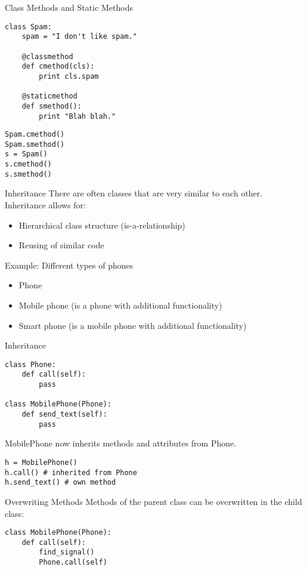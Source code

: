 \begin{frame}[fragile]{Class Methods and Static Methods}
\begin{lstlisting}[style=Python]
class Spam:
    spam = "I don't like spam."

    @classmethod
    def cmethod(cls):
        print cls.spam
       
    @staticmethod
    def smethod():
        print "Blah blah."
\end{lstlisting}
\begin{lstlisting}[style=Python]
Spam.cmethod()
Spam.smethod()
s = Spam()
s.cmethod()
s.smethod()
\end{lstlisting}
\end{frame}

\begin{frame}{Inheritance}
There are often classes that are very similar to each other.\\
\alert{Inheritance} allows for:
\begin{itemize}
\item Hierarchical class structure (is-a-relationship)
\item Reusing of similar code
\end{itemize}
\vspace{5mm}
Example: Different types of phones
\begin{itemize}
\item Phone
\item Mobile phone (is a phone with additional functionality)
\item Smart phone (is a mobile phone with additional functionality)
\end{itemize}
\end{frame}

\begin{frame}[fragile]{Inheritance}
\begin{lstlisting}[style=Python]
class Phone:
    def call(self):
        pass

class MobilePhone(Phone):
    def send_text(self):
        pass
\end{lstlisting}
MobilePhone now inherits methods and attributes from Phone.
\begin{lstlisting}[style=Python]
h = MobilePhone()
h.call() # inherited from Phone
h.send_text() # own method
\end{lstlisting}
\end{frame}

\begin{frame}[fragile]{Overwriting Methods}
Methods of the parent class can be overwritten in the child class:
\begin{lstlisting}[style=Python]
class MobilePhone(Phone):
    def call(self):
        find_signal()
        Phone.call(self)
\end{lstlisting}
\end{frame}

